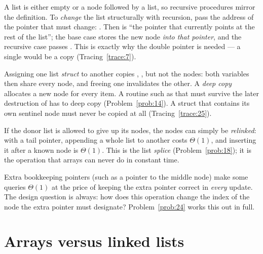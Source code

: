 A list is either empty or a node followed by a list, so recursive
procedures mirror the definition. To \emph{change} the list structurally with recursion,
pass the address of the pointer that must change: . Then
 is ``the pointer that currently points at the rest of the list''; the base case
 stores the new node \emph{into that pointer}, and the recursive case passes
. This is exactly why the double pointer is needed --- a single
 would be a copy (Tracing~\ref{trace:7}).

 Assigning one list \emph{struct} to another copies
, ,  but not the nodes: both variables then share every node,
and freeing one invalidates the other. A \emph{deep copy} allocates a new node for every
item. A routine such as  that must survive the later destruction of
 has to deep copy (Problem~\ref{prob:14}). A struct that contains its own sentinel
node must never be copied at all (Tracing~\ref{trace:25}).

 If the donor list is allowed to give up its nodes,
the nodes can simply be \emph{relinked}: with a tail pointer, appending a whole list to
another costs $\Theta(1)$, and inserting it after a known node is $\Theta(1)$. This is
the list \emph{splice} (Problem~\ref{prob:18}); it is the operation that arrays can never
do in constant time.

 Extra bookkeeping pointers (such as a pointer to the middle
node) make some queries $\Theta(1)$ at the price of keeping the extra pointer correct in
\emph{every} update. The design question is always: how does this operation change the
index of the node the extra pointer must designate? Problem~\ref{prob:24} works this out
in full.

\section{Arrays versus linked lists}

